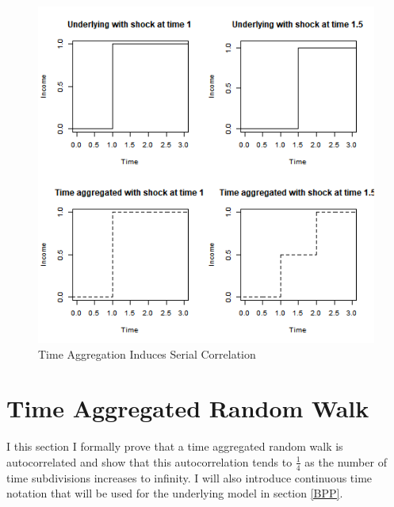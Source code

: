 \documentclass[titlepage]{\econtex}\newcommand{\texname}{BPP_TimeAgg}
\begin{document}
\begin{figure}
	\caption{Time Aggregation Induces Serial Correlation}
	\label{fig:TimeAggExample}
	\includegraphics[width=1\textwidth]{../Code/Figures/TimeAggExample.png}
\end{figure}


\section{Time Aggregated Random Walk} \label{TimeAggRandomWalk}
I this section I formally prove that a time aggregated random walk is autocorrelated and show that this autocorrelation tends to $\frac{1}{4}$ as the number of time subdivisions increases to infinity. I will also introduce continuous time notation that will be used for the underlying model in section \ref{BPP}.
\end{document}
